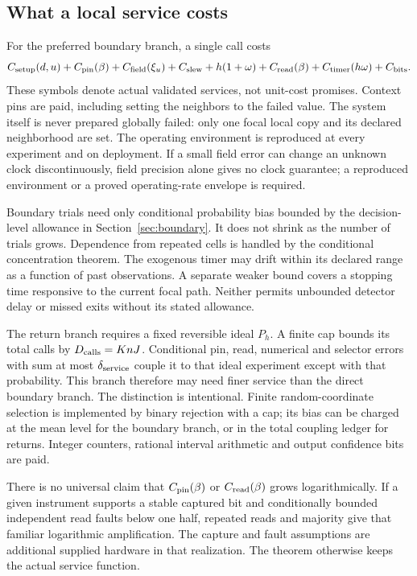 \subsection{What a local service costs}
\label{sec:services}
For the preferred boundary branch, a single call costs
\begin{equation}
 C_{\rm setup}(d,u)+C_{\rm pin}(\beta)+C_{\rm field}(\xi_u)
 +C_{\rm slew}+h(1+\omega)+C_{\rm read}(\beta)+C_{\rm timer}(h\omega)
 +C_{\rm bits}.
 \label{eq:physicalservice}
\end{equation}
These symbols denote actual validated services, not unit-cost promises. Context pins are paid, including setting the neighbors to the failed value. The system itself is never prepared globally failed: only one focal local copy and its declared neighborhood are set. The operating environment is reproduced at every experiment and on deployment. If a small field error can change an unknown clock discontinuously, field precision alone gives no clock guarantee; a reproduced environment or a proved operating-rate envelope is required.

Boundary trials need only conditional probability bias bounded by the decision-level allowance in Section~\ref{sec:boundary}. It does not shrink as the number of trials grows. Dependence from repeated cells is handled by the conditional concentration theorem. The exogenous timer may drift within its declared range as a function of past observations. A separate weaker bound covers a stopping time responsive to the current focal path. Neither permits unbounded detector delay or missed exits without its stated allowance.

The return branch requires a fixed reversible ideal $P_h$. A finite cap bounds its total calls by $D_{
\rm calls}=KnJ$. Conditional pin, read, numerical and selector errors with sum at most $\delta_{
\rm service}$ couple it to that ideal experiment except with that probability. This branch therefore may need finer service than the direct boundary branch. The distinction is intentional. Finite random-coordinate selection is implemented by binary rejection with a cap; its bias can be charged at the mean level for the boundary branch, or in the total coupling ledger for returns. Integer counters, rational interval arithmetic and output confidence bits are paid.

There is no universal claim that $C_{\rm pin}(\beta)$ or $C_{\rm read}(\beta)$ grows logarithmically. If a given instrument supports a stable captured bit and conditionally bounded independent read faults below one half, repeated reads and majority give that familiar logarithmic amplification. The capture and fault assumptions are additional supplied hardware in that realization. The theorem otherwise keeps the actual service function.


